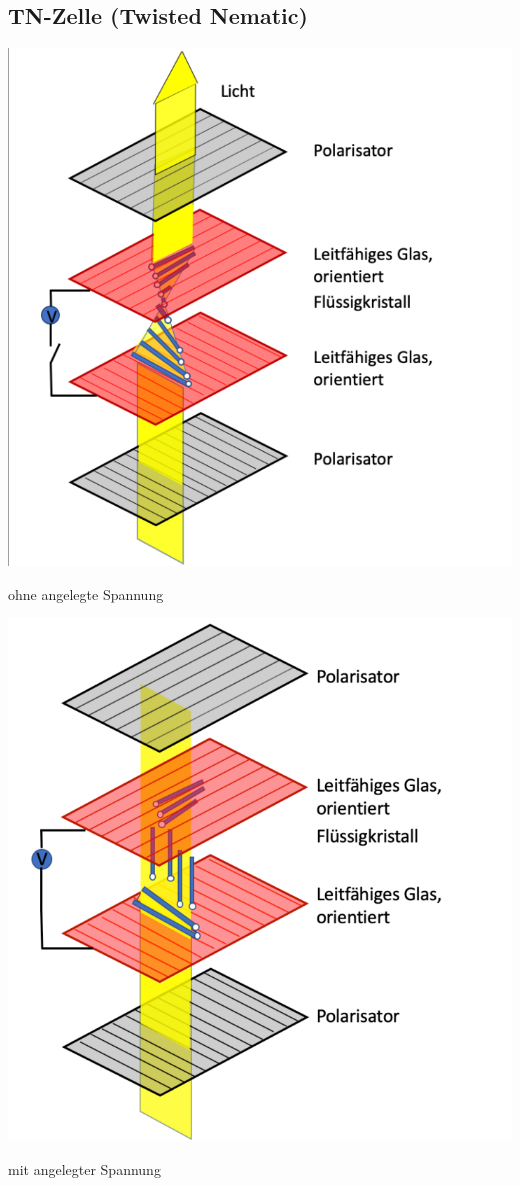 \subsection{TN-Zelle (Twisted Nematic)}
\begin{minipage}{0.48\linewidth}
    \begin{center}
        \includegraphics[width=0.8\linewidth]{pictures/TN-Zelle1.png}
    
        ohne angelegte Spannung   
    \end{center}
\end{minipage}
\hfill
\begin{minipage}{0.48\linewidth}
    \begin{center}
        \includegraphics[width=0.8\linewidth]{pictures/TN-Zelle2.png} 
    
        mit angelegter Spannung 
    \end{center}
\end{minipage}

